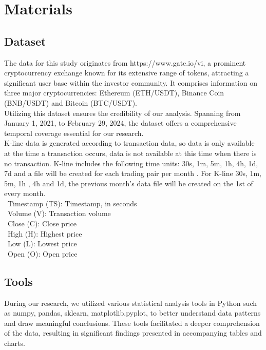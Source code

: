 \documentclass{ieeeojies}
\begin{document}
\section{Materials}
\subsection{Dataset}
The data for this study originates from https://www.gate.io/vi, a prominent cryptocurrency exchange known for its extensive range of tokens, attracting a significant user base within the investor community. It comprises information on three major cryptocurrencies: Ethereum (ETH/USDT), Binance Coin (BNB/USDT) and Bitcoin (BTC/USDT).\\
Utilizing this dataset ensures the credibility of our analysis. Spanning from January 1, 2021, to February 29, 2024, the dataset offers a comprehensive temporal coverage essential for our research.\\
K-line data is generated according to transaction data, so data is only available at the time a transaction occurs, data is not available at this time when there is no transaction. K-line includes the following time units: 30s, 1m, 5m, 1h, 4h, 1d, 7d and a file will be created for each trading pair per month . For K-line 30s, 1m, 5m, 1h , 4h and 1d, the previous month's data file will be created on the 1st of every month.\\
    \indent\ Timestamp (TS): Timestamp, in seconds\\
    \indent\ Volume (V): Transaction volume\\ 
    \indent\ Close (C): Close price\\
    \indent\ High (H): Highest price\\ 
    \indent\ Low (L): Lowest price\\
    \indent\ Open (O): Open price\\

\subsection{Tools}

During our research, we utilized various statistical analysis tools in Python such as numpy, pandas, sklearn, matplotlib.pyplot, to better understand data patterns and draw meaningful conclusions. These tools facilitated a deeper comprehension of the data, resulting in significant findings presented in accompanying tables and charts.
\end{document}

